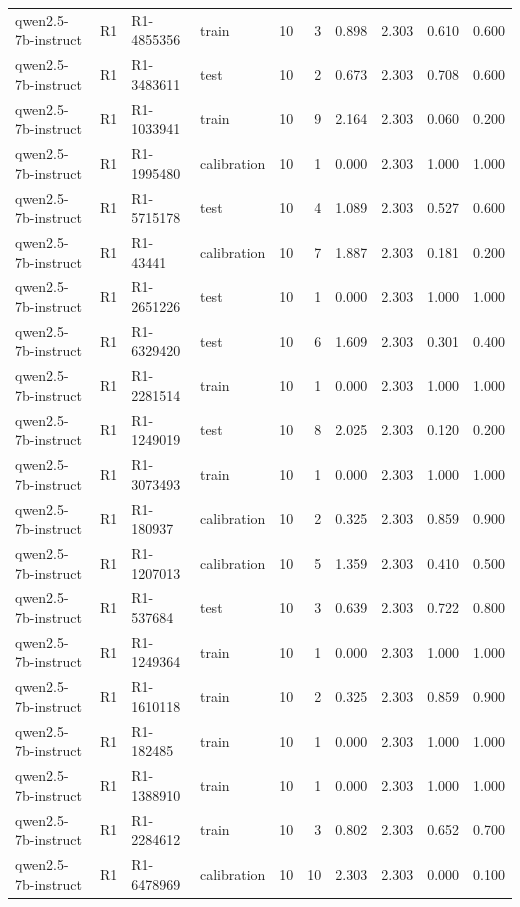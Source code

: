 \begin{table}
\begin{tabular}{llllrrrrrr}
qwen2.5-7b-instruct & R1 & R1-4855356 & train & 10 & 3 & 0.898 & 2.303 & 0.610 & 0.600 \\
qwen2.5-7b-instruct & R1 & R1-3483611 & test & 10 & 2 & 0.673 & 2.303 & 0.708 & 0.600 \\
qwen2.5-7b-instruct & R1 & R1-1033941 & train & 10 & 9 & 2.164 & 2.303 & 0.060 & 0.200 \\
qwen2.5-7b-instruct & R1 & R1-1995480 & calibration & 10 & 1 & 0.000 & 2.303 & 1.000 & 1.000 \\
qwen2.5-7b-instruct & R1 & R1-5715178 & test & 10 & 4 & 1.089 & 2.303 & 0.527 & 0.600 \\
qwen2.5-7b-instruct & R1 & R1-43441 & calibration & 10 & 7 & 1.887 & 2.303 & 0.181 & 0.200 \\
qwen2.5-7b-instruct & R1 & R1-2651226 & test & 10 & 1 & 0.000 & 2.303 & 1.000 & 1.000 \\
qwen2.5-7b-instruct & R1 & R1-6329420 & test & 10 & 6 & 1.609 & 2.303 & 0.301 & 0.400 \\
qwen2.5-7b-instruct & R1 & R1-2281514 & train & 10 & 1 & 0.000 & 2.303 & 1.000 & 1.000 \\
qwen2.5-7b-instruct & R1 & R1-1249019 & test & 10 & 8 & 2.025 & 2.303 & 0.120 & 0.200 \\
qwen2.5-7b-instruct & R1 & R1-3073493 & train & 10 & 1 & 0.000 & 2.303 & 1.000 & 1.000 \\
qwen2.5-7b-instruct & R1 & R1-180937 & calibration & 10 & 2 & 0.325 & 2.303 & 0.859 & 0.900 \\
qwen2.5-7b-instruct & R1 & R1-1207013 & calibration & 10 & 5 & 1.359 & 2.303 & 0.410 & 0.500 \\
qwen2.5-7b-instruct & R1 & R1-537684 & test & 10 & 3 & 0.639 & 2.303 & 0.722 & 0.800 \\
qwen2.5-7b-instruct & R1 & R1-1249364 & train & 10 & 1 & 0.000 & 2.303 & 1.000 & 1.000 \\
qwen2.5-7b-instruct & R1 & R1-1610118 & train & 10 & 2 & 0.325 & 2.303 & 0.859 & 0.900 \\
qwen2.5-7b-instruct & R1 & R1-182485 & train & 10 & 1 & 0.000 & 2.303 & 1.000 & 1.000 \\
qwen2.5-7b-instruct & R1 & R1-1388910 & train & 10 & 1 & 0.000 & 2.303 & 1.000 & 1.000 \\
qwen2.5-7b-instruct & R1 & R1-2284612 & train & 10 & 3 & 0.802 & 2.303 & 0.652 & 0.700 \\
qwen2.5-7b-instruct & R1 & R1-6478969 & calibration & 10 & 10 & 2.303 & 2.303 & 0.000 & 0.100 \\

\end{tabular}
\end{table}
